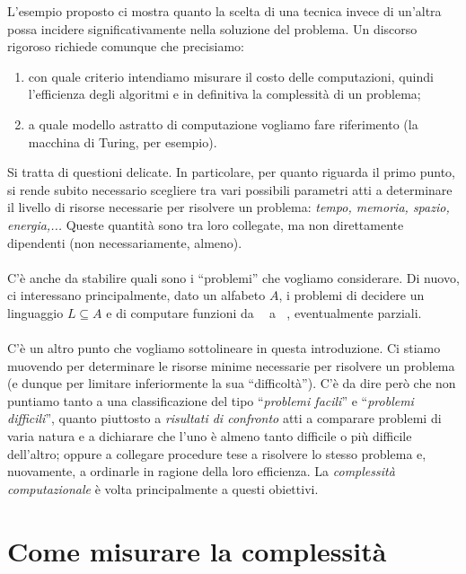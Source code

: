\documentclass[12pt,a4paper]{report}
\theoremstyle{definition}
\DeclareMathOperator{\aaa}{\textit{A}^{\star}}
\begin{document}
L'esempio proposto ci mostra quanto la scelta di una tecnica invece di un'altra possa incidere significativamente nella soluzione del problema. Un discorso rigoroso richiede comunque che precisiamo:
\begin{enumerate}
\item con quale criterio intendiamo misurare il costo delle computazioni, quindi l'efficienza degli algoritmi e in definitiva la complessità di un problema;
\item a quale modello astratto di computazione vogliamo fare riferimento (la macchina di Turing, per esempio).
\end{enumerate}
Si tratta di questioni delicate. In particolare, per quanto riguarda il primo punto, si rende subito necessario scegliere tra vari possibili parametri atti a determinare il livello di risorse necessarie per risolvere un problema: \emph{tempo, memoria, spazio, energia,...} Queste quantità sono tra loro collegate, ma non direttamente dipendenti (non necessariamente, almeno).\\
\\
C'è anche da stabilire quali sono i ``problemi'' che vogliamo considerare. Di nuovo, ci interessano principalmente, dato un alfabeto $A$, i problemi di decidere un linguaggio $L \subseteq A$ e di computare funzioni da $\aaa$ a $\aaa$, eventualmente parziali.\\
\\
C'è un altro punto che vogliamo sottolineare in questa introduzione. Ci stiamo muovendo per determinare le risorse minime necessarie per risolvere un problema (e dunque per limitare inferiormente la sua ``difficoltà''). C'è da dire però che non puntiamo tanto a una classificazione del tipo ``\emph{problemi facili}'' e ``\emph{problemi difficili}'', quanto piuttosto a \emph{risultati di confronto} atti a comparare problemi di varia natura e a dichiarare che l'uno è almeno tanto difficile o più difficile dell'altro; oppure a collegare procedure tese a risolvere lo stesso problema e, nuovamente, a ordinarle in ragione della loro efficienza. La \emph{complessità computazionale} è volta principalmente a questi obiettivi.


\section{Come misurare la complessità}
\end{document}
